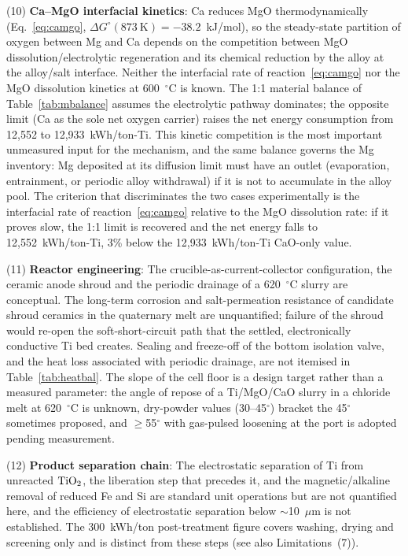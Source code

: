 \documentclass[11pt]{article}
\begin{document}
(10) \textbf{Ca--MgO interfacial kinetics}: Ca reduces MgO thermodynamically (Eq.~\ref{eq:camgo}, $\Delta G^{\circ}(873~\mathrm{K}) = -38.2$~kJ/mol), so the steady-state partition of oxygen between Mg and Ca depends on the competition between MgO dissolution/electrolytic regeneration and its chemical reduction by the alloy at the alloy/salt interface. Neither the interfacial rate of reaction~\ref{eq:camgo} nor the MgO dissolution kinetics at 600~$^{\circ}$C is known. The 1:1 material balance of Table~\ref{tab:mbalance} assumes the electrolytic pathway dominates; the opposite limit (Ca as the sole net oxygen carrier) raises the net energy consumption from 12{,}552 to 12{,}933~kWh/ton-Ti. This kinetic competition is the most important unmeasured input for the mechanism, and the same balance governs the Mg inventory: Mg deposited at its diffusion limit must have an outlet (evaporation, entrainment, or periodic alloy withdrawal) if it is not to accumulate in the alloy pool. The criterion that discriminates the two cases experimentally is the interfacial rate of reaction~\ref{eq:camgo} relative to the MgO dissolution rate: if it proves slow, the 1:1 limit is recovered and the net energy falls to 12{,}552~kWh/ton-Ti, 3\% below the 12{,}933~kWh/ton-Ti CaO-only value.

(11) \textbf{Reactor engineering}: The crucible-as-current-collector configuration, the ceramic anode shroud and the periodic drainage of a 620~$^{\circ}$C slurry are conceptual. The long-term corrosion and salt-permeation resistance of candidate shroud ceramics in the quaternary melt are unquantified; failure of the shroud would re-open the soft-short-circuit path that the settled, electronically conductive Ti bed creates. Sealing and freeze-off of the bottom isolation valve, and the heat loss associated with periodic drainage, are not itemised in Table~\ref{tab:heatbal}. The slope of the cell floor is a design target rather than a measured parameter: the angle of repose of a Ti/MgO/CaO slurry in a chloride melt at 620~$^{\circ}$C is unknown, dry-powder values (30--45$^{\circ}$) bracket the 45$^{\circ}$ sometimes proposed, and $\geq$55$^{\circ}$ with gas-pulsed loosening at the port is adopted pending measurement.

(12) \textbf{Product separation chain}: The electrostatic separation of Ti from unreacted $\ce{TiO2}$, the liberation step that precedes it, and the magnetic/alkaline removal of reduced Fe and Si are standard unit operations but are not quantified here, and the efficiency of electrostatic separation below $\sim$10~$\mu$m is not established. The 300~kWh/ton post-treatment figure covers washing, drying and screening only and is distinct from these steps (see also Limitations~(7)).
\end{document}
